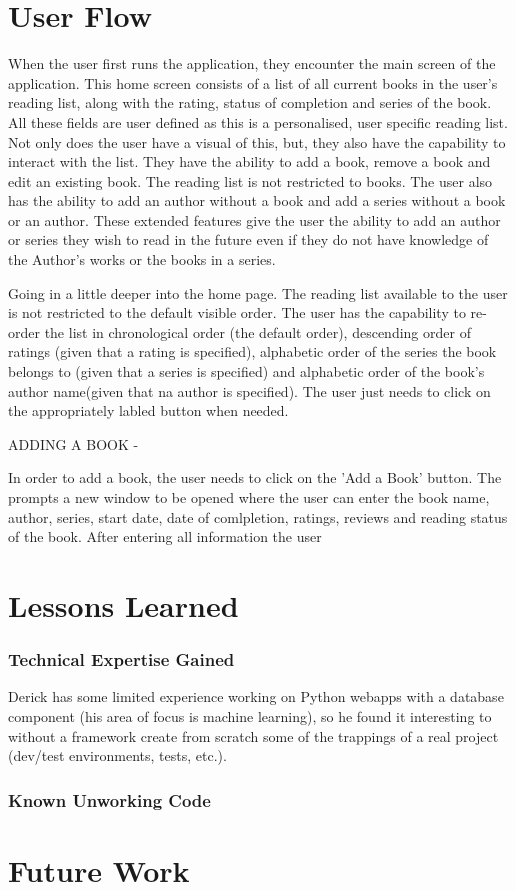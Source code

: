 \documentclass{article}
\begin{document}
\section*{User Flow}

When the user first runs the application, they encounter the main screen of the application. 
This home screen consists of a list of all current books in the user's reading list, along 
with the rating, status of completion and series of the book. All these fields are user defined 
as this is a personalised, user specific reading list. Not only does the user have a visual of this, 
but, they also have the capability to interact with the list. They have the ability to add a book, 
remove a book and edit an existing book. The reading list is not restricted to books. The user 
also has the ability to add an author without a book and add a series without a book or an author. 
These extended features give the user the ability to add an author or series they wish to read in 
the future even if they do not have knowledge of the Author's works or the books in a series.

Going in a little deeper into the home page. The reading list available to the user is not 
restricted to the default visible order. The user has the capability to re-order the list in 
chronological order (the default order), descending order of ratings (given that a rating is specified), 
alphabetic order of the series the book belongs to (given that a series is specified) and alphabetic 
order of the book's author name(given that na author is specified). The user just needs to click on 
the appropriately labled button when needed.

ADDING A BOOK - 

In order to add a book, the user needs to click on the 'Add a Book' button. The prompts a new window to 
be opened where the user can enter the book name, author, series, start date, date of comlpletion, 
ratings, reviews and reading status of the book. After entering all information the user 


\section*{Lessons Learned}

\subsubsection*{Technical Expertise Gained}

Derick has some limited experience
working on Python webapps with a database component
(his area of focus is machine learning),
so he found it interesting to without a framework create from scratch
some of the trappings of a real project
(dev/test environments, tests, etc.).


\subsubsection*{Known Unworking Code}


\section*{Future Work}
\end{document}
